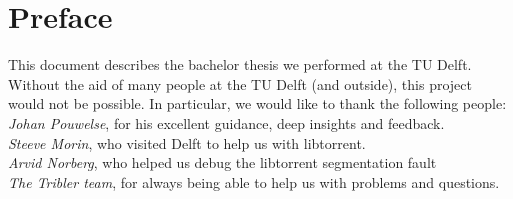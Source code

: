 \chapter*{Preface}
This document describes the bachelor thesis we performed at the TU Delft. Without the aid of many people at the TU Delft (and outside), this project would not be possible. In particular, we would like to thank the following people: \\

\emph{Johan Pouwelse}, for his excellent guidance, deep insights and feedback.\\

\emph{Steeve Morin}, who visited Delft to help us with libtorrent.\\

\emph{Arvid Norberg}, who helped us debug the libtorrent segmentation fault\\

\emph{The Tribler team}, for always being able to help us with problems and questions.